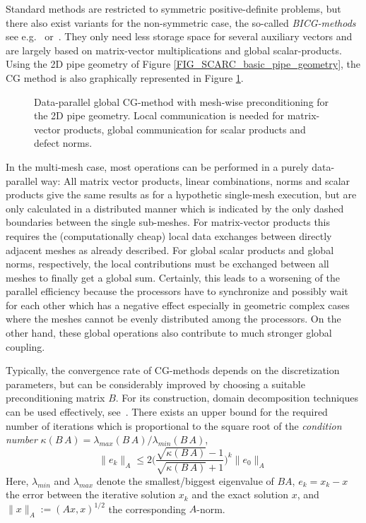 \vspace{0.5cm}

Standard methods are restricted to symmetric positive-definite problems, but
there also exist variants for the non-symmetric case, the so-called {\it BICG-methods} see e.g.~\cite{Saad:2003} or~\cite{Axelsson:1998}.
%
They only need less storage space for several auxiliary vectors and are largely based on matrix-vector multiplications and global scalar-products.
%
Using the 2D pipe geometry of Figure \ref{FIG_SCARC_basic_pipe_geometry}, the CG method is also graphically represented in Figure \ref{FIG_SCARC_cg_method}.
\begin{figure}[ht]
\centering
\caption{Data-parallel global CG-method with mesh-wise preconditioning for the 2D pipe geometry. Local communication is needed for matrix-vector products, global communication for scalar products and defect norms.} 
\label{FIG_SCARC_cg_method}
\end{figure}

\newpage
In the multi-mesh case, most operations can be performed in a purely data-parallel way: All matrix vector products, linear combinations, norms and scalar products give the same results as for a hypothetic single-mesh execution, but are only calculated in a distributed manner which is indicated by the only dashed boundaries between the single sub-meshes. For matrix-vector products this requires the (computationally cheap) local data exchanges between directly adjacent meshes as already described. For global scalar products %
and global norms, respectively, the local contributions must be exchanged between all meshes to finally get a global sum. Certainly, this leads to a worsening of the parallel efficiency because the processors have to synchronize and possibly wait for each other which has a negative effect especially in geometric complex cases where the meshes cannot be evenly distributed among the processors. On the other hand, these global operations also contribute to much stronger global coupling.

Typically, the convergence rate of CG-methods  depends on the discretization parameters, but can be considerably improved by choosing a suitable preconditioning matrix $B$. For its construction, domain decomposition techniques can be used effectively, see~\cite{Bramble:1991}.
There exists an upper bound for the required number of iterations which is
proportional to the square root of the {\it condition number} $\kappa (B \, A) = \lambda_{max} (B \, A) / \lambda_{min} (B\, A)$,
\[ \| e_k \|_A \leq 2 \big(\frac{\sqrt{\kappa (B \,A)} -1}{\sqrt{\kappa (B \,A)} +1}\big)^k \| e_0\|_A\,\]  
Here, $\lambda_{min}$ and $\lambda_{max}$ denote the smallest/biggest eigenvalue of $B A$, $e_k= x_k - x$ the error between the iterative solution $x_k$ and the exact solution $x$, and  $\|x\|_A := (Ax,x) ^{1/2}$ the corresponding $A$-norm.

